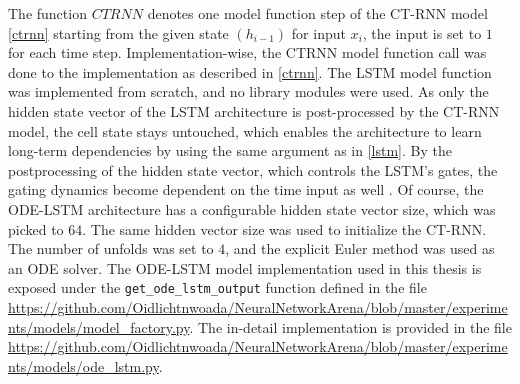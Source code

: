\documentclass[draft,final]{vutinfth} %
\begin{document}
    The function $CTRNN$ denotes one model function step of the CT-RNN model \ref{ctrnn} starting from the given state $(h_{i-1})$ for input $x_i$, the input is set to $1$ for each time step.
    Implementation-wise, the CTRNN model function call was done to the implementation as described in \ref{ctrnn}.
    The LSTM model function was implemented from scratch, and no library modules were used. 
    As only the hidden state vector of the LSTM architecture is post-processed by the CT-RNN model, the cell state stays untouched, which enables the architecture to learn long-term dependencies by using the same argument as in \ref{lstm}.
    By the postprocessing of the hidden state vector, which controls the LSTM's gates, the gating dynamics become dependent on the time input as well \cite[p. 4]{ODELSTM}.
    Of course, the ODE-LSTM architecture has a configurable hidden state vector size, which was picked to $64$.
    The same hidden vector size was used to initialize the CT-RNN. The number of unfolds was set to $4$, and the explicit Euler method was used as an ODE solver.
    The ODE-LSTM model implementation used in this thesis is exposed under the \texttt{get\_ode\_lstm\_output} function defined in the file \url{https://github.com/Oidlichtnwoada/NeuralNetworkArena/blob/master/experiments/models/model_factory.py}.
    The in-detail implementation is provided in the file \url{https://github.com/Oidlichtnwoada/NeuralNetworkArena/blob/master/experiments/models/ode_lstm.py}.
\end{document}
